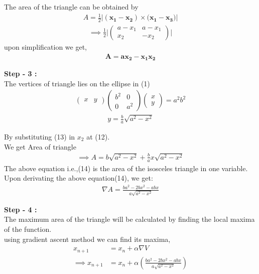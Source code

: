 \documentclass[10pt,a4paper]{report}
\newcommand{\myvec}[1]{\ensuremath{\begin{pmatrix}#1\end{pmatrix}}}
\let\vec\mathbf
\providecommand{\brak}[1]{\ensuremath{\left(#1\right)}}
\begin{document}
\begin{multicols}{2}
The area of the triangle can be obtained by
\begin{align}
A=\frac{1}{2} |(\vec{x_1}- \vec{x_2}) \times (\vec{x_1} - \vec{x_3)}|
\end{align}
\begin{align}
\implies \frac{1}{2} \Big| \myvec{a-x_1 & a-x_1\\x_2 & -x_2} \Big|
\end{align}
upon simplification we get,
\begin{align}
\vec{A}=\vec{ax_2-x_1x_2}
\end{align}

\raggedright \textbf{Step - 3 :}\\ \vspace{2mm}
The vertices of triangle lies on the ellipse in (1)
\begin{align*}
\myvec{x&y}\myvec{b^2&0\\0&a^2}\myvec{x\\y}=a^2b^2
\end{align*}
\begin{align}
y=\frac{b}{a}\sqrt{a^2-x^2}
\end{align}

\centering By substituting (13) in $x_2$ at (12). \\We get Area of triangle
\begin{align}
\implies A=b\sqrt{a^2-x^2}+\frac{b}{a}x\sqrt{a^2-x^2}
\end{align}
The above equation i.e.,(14) is the area of the isosceles triangle in one variable.\\
Upon derivating the above equation(14), we get:
\begin{align}
\nabla A = \frac{ba^2-2bx^2-abx}{a\sqrt{a^2-x^2}}
\end{align}

\raggedright \textbf{Step - 4 :}\\ \vspace{2mm}
The maximum area of the triangle will be calculated by finding the local maxima of the function.\\
using gradient ascent method we can find its maxima,
\begin{align}
x_{n+1} &= x_n + \alpha \nabla V \\
\implies x_{n+1} &= x_n + \alpha \brak{\frac{ba^2-2bx^2-abx}{a\sqrt{a^2-x^2}}}
\end{align}


\end{multicols}
\end{document}
